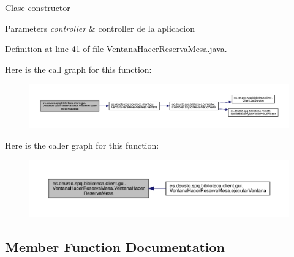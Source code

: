 Clase constructor 
\begin{DoxyParams}{Parameters}
{\em controller} & controller de la aplicacion \\
\hline
\end{DoxyParams}


Definition at line 41 of file Ventana\+Hacer\+Reserva\+Mesa.\+java.

Here is the call graph for this function\+:
\nopagebreak
\begin{figure}[H]
\begin{center}
\leavevmode
\includegraphics[width=350pt]{classes_1_1deusto_1_1spq_1_1biblioteca_1_1client_1_1gui_1_1_ventana_hacer_reserva_mesa_a74ccf83761251354774c463d838c2ff4_cgraph}
\end{center}
\end{figure}
Here is the caller graph for this function\+:
\nopagebreak
\begin{figure}[H]
\begin{center}
\leavevmode
\includegraphics[width=350pt]{classes_1_1deusto_1_1spq_1_1biblioteca_1_1client_1_1gui_1_1_ventana_hacer_reserva_mesa_a74ccf83761251354774c463d838c2ff4_icgraph}
\end{center}
\end{figure}


\subsection{Member Function Documentation}
\mbox{\label{classes_1_1deusto_1_1spq_1_1biblioteca_1_1client_1_1gui_1_1_ventana_hacer_reserva_mesa_add76e330dbe570de87529a4a8323e2f2}} 
